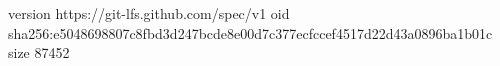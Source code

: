 version https://git-lfs.github.com/spec/v1
oid sha256:e5048698807c8fbd3d247bcde8e00d7c377ecfccef4517d22d43a0896ba1b01c
size 87452
